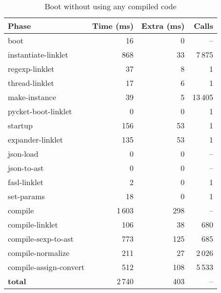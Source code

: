 		\begin{table}[ht]
		\centering
		\begin{tabular}{@{}lrrr@{}}
			\toprule
			Phase & Time (ms) & Extra (ms) & Calls \\ \midrule
			boot                           &     16 &    0 & -- \\
			instantiate-linklet            &    868 &   33 & 7\,875 \\
			regexp-linklet                 &     37 &    8 & 1 \\
			thread-linklet                 &     17 &    6 & 1 \\
			make-instance                  &     39 &    5 & 13\,405 \\
			pycket-boot-linklet            &      0 &    0 & 1 \\
			startup                        &    156 &   53 & 1 \\
			\quad expander-linklet         &    135 &   53 & 1 \\
			\quad json-load                &      0 &    0 & -- \\
			\quad json-to-ast              &      0 &    0 & -- \\
			\quad fasl-linklet             &      2 &    0 & 1 \\
			\quad set-params               &     18 &    0 & 1 \\ \midrule
			compile                        &  1\,603 &  298 & -- \\
			\quad compile-linklet          &    106 &   38 & 680 \\
			\quad compile-sexp-to-ast      &    773 &  125 & 685 \\
			\quad compile-normalize        &    211 &   27 & 2\,026 \\
			\quad compile-assign-convert   &    512 &  108 & 5\,533 \\ \midrule
			\textbf{total}                 &  2\,740 &  403 & -- \\
			\bottomrule
		\end{tabular}
		\caption{Boot without using any compiled code}
		\label{tab:boot-no-compiled}
		\end{table}


